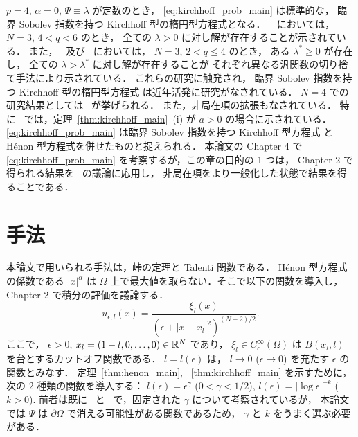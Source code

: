 $p = 4$, $\alpha = 0$, $\Psi \equiv \lambda$ が定数のとき，
\eqref{eq:kirchhoff_prob_main} は標準的な，
臨界 Sobolev 指数を持つ Kirchhoff 型の楕円型方程式となる．
~\cite{MR3278854} においては，
$N = 3$, $4 < q < 6$ のとき，
全ての $\lambda > 0$ に対し解が存在することが示されている．
また，~\cite{MR3018020} 及び~\cite{MR3278854} においては，
$N = 3$, $2 < q \leq 4$ のとき，
ある $\lambda^* \geq 0$ が存在し，
全ての $\lambda > \lambda^*$ に対し解が存在することが
それぞれ異なる汎関数の切り捨て手法により示されている．
これらの研究に触発され，
臨界 Sobolev 指数を持つ Kirchhoff 型の楕円型方程式
は近年活発に研究がなされている．
$N = 4$ での研究結果としては~\cite{MR3210026} が挙げられる．
また，非局在項の拡張もなされている．
特に~\cite{MR3539075} では，定理~\ref{thm:kirchhoff_main}~(i) が
$a > 0$ の場合に示されている．
\eqref{eq:kirchhoff_prob_main}
は臨界 Sobolev 指数を持つ Kirchhoff 型方程式
と Hénon 型方程式を併せたものと捉えられる．
本論文の Chapter 4 で
\eqref{eq:kirchhoff_prob_main} を考察するが，この章の目的の 1 つは，
Chapter 2 で得られる結果を~\cite{MR3278854} の議論に応用し，
非局在項をより一般化した状態で結果を得ることである．

\section{手法}

本論文で用いられる手法は，峠の定理と Talenti 関数である．
Hénon 型方程式の係数である $\lvert x \rvert^\alpha$ は
$\Omega$ 上で最大値を取らない．そこで以下の関数を導入し，
Chapter 2 で積分の評価を議論する．
\[
  u_{\epsilon, l}(x) = \frac{\xi_l(x)}{\left(\epsilon +
    \left\lvert x - x_l \right\rvert^2 \right)^{(N-2)/2}}.
\]
ここで， $\epsilon > 0$, $x_l = (1-l, 0, \dots, 0) \in \mathbb{R}^N$ であり，
$\xi_l \in C^\infty_c (\Omega)$ は
$B(x_l, l)$ を台とするカットオフ関数である．
$l = l(\epsilon)$ は，
$l \to 0$ ($\epsilon \to 0$) を充たす
$\epsilon$ の関数とみなす．
定理~\ref{thm:henon_main}, ~\ref{thm:kirchhoff_main} を示すために，
次の $2$ 種類の関数を導入する：
$l(\epsilon) = \epsilon^\gamma$ ($0 < \gamma < 1/2$),
$l(\epsilon) = \lvert \log \epsilon \rvert^{-k}$ ($k > 0$).
前者は既に~\cite{MR2951742} と~\cite{MR2951722}
で，固定された $\gamma$ について考察されているが，
本論文では $\Psi$ は $\partial \Omega$ で消える可能性がある関数であるため，
$\gamma$ と $k$ をうまく選ぶ必要がある．

